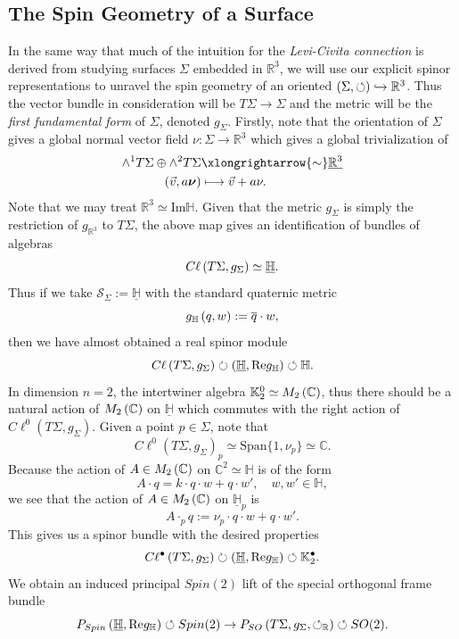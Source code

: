 \documentclass[openany, 11pt]{article}
\theoremstyle{definition}
\theoremstyle{remark}
\def\lp{\ensuremath{\left(}}
\def\rp{\ensuremath{\right)}}
\def\Sc{\ensuremath{\mathscr{S}}}
\def\cal{\ensuremath{\boldsymbol{\circlearrowleft}}}
\def\bC{\ensuremath{\mathbb{C}}}
\def\bH{\ensuremath{\mathbb{H}}}
\def\bR{\ensuremath{\mathbb{R}}}
\def\bK{\ensuremath{\mathbb{K}}}
\begin{document}
\subsection{The Spin Geometry of a Surface}
In the same way that much of the intuition for the \emph{Levi-Civita connection} is derived from studying surfaces $\Sigma$ embedded in $\bR^3$, we will use our explicit spinor representations to unravel the spin geometry of an oriented $\lp\Sigma,\cal\rp\hookrightarrow \bR^3$. Thus the vector bundle in consideration will be $T\Sigma\rightarrow \Sigma$ and the metric will be the \emph{first fundamental form} of $\Sigma$, denoted $g_{\Sigma}$. Firstly, note that the orientation of $\Sigma$ gives a global normal vector field $\nu:\Sigma\rightarrow\bR^3$ which gives a global trivialization of
\begin{align*}
    \wedge^1T\Sigma\oplus\wedge^2 T\Sigma&\xlongrightarrow{\sim}\underline{\bR^3}\\
    \lp \vec{v},a\boldsymbol{\nu}\rp&\longmapsto \vec{v}+a\nu.
\end{align*}
Note that we may treat $\bR^3\simeq \text{Im}\bH$. Given that the metric $g_{\Sigma}$ is simply the restriction of $g_{\bR^3}$ to $T\Sigma$, the above map gives an identification of bundles of algebras
\[
    C\ell\lp T\Sigma,g_{\Sigma}\rp\simeq \underline{\bH}.
\]
Thus if we take $\Sc_{\Sigma}:=\underline{\bH}$ with the standard quaternic metric 
\[
    g_{\bH}\lp q,w\rp:=\overline{q}\cdot w,
\]
then we have almost obtained a real spinor module
\[
    C\ell\lp T\Sigma,g_{\Sigma}\rp\circlearrowright \lp\underline{\bH},\text{Re}g_{\bH}\rp\circlearrowleft\bH.
\]
In dimension $n=2$, the intertwiner algebra $\bK^0_2\simeq M_2\lp\bC\rp$, thus there should be a natural action of $M_2\lp\bC\rp$ on $\underline{\bH}$ which commutes with the right action of $C\ell^0(T\Sigma,g_{\Sigma})$. Given a point $p\in\Sigma$, note that
\[
    C\ell^0(T\Sigma,g_{\Sigma})_p\simeq \text{Span}\{1,\nu_p\}\simeq\bC.
\]
Because the action of $A\in M_2\lp\bC\rp$ on $\bC^2\simeq\bH$ is of the form
\[
    A\cdot q=k\cdot q\cdot w+q\cdot w',\quad w,w'\in\bH,
\]
we see that the action of $A\in M_2\lp\bC\rp$ on $\underline{\bH}_p$ is
\[
    A\cdot_p q:=\nu_p\cdot q\cdot w+q\cdot w'.
\]
This gives us a spinor bundle with the desired properties
\[
    C\ell^{\bullet}\lp T\Sigma,g_{\Sigma}\rp\circlearrowright\lp\underline{\bH},\text{Re}g_{\bH}\rp\circlearrowleft\bK^{\bullet}_2.
\]
We obtain an induced principal $Spin(2)$ lift of the special orthogonal frame bundle
\[
    P_{Spin}\lp\underline{\bH},\text{Re}g_{\bH}\rp\circlearrowleft Spin(2)\rightarrow P_{SO}\lp T\Sigma,g_{\Sigma},\cal_{\bR}\rp\circlearrowleft SO(2).
\]
\end{document}
